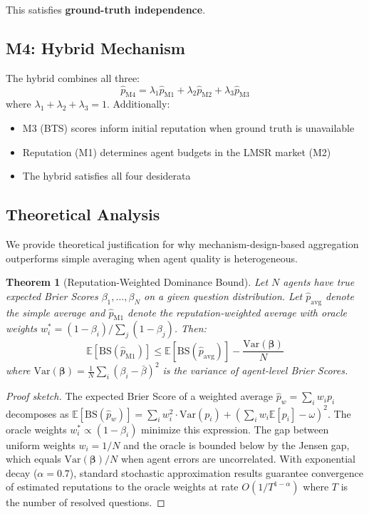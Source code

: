 \documentclass[conference]{IEEEtran}
\newtheorem{theorem}{Theorem}
\begin{document}
This satisfies \textbf{ground-truth independence}.

\subsection{M4: Hybrid Mechanism}

The hybrid combines all three:
\begin{equation}
    \hat{p}_{\text{M4}} = \lambda_1 \hat{p}_{\text{M1}} + \lambda_2 \hat{p}_{\text{M2}} + \lambda_3 \hat{p}_{\text{M3}}
\end{equation}
where $\lambda_1 + \lambda_2 + \lambda_3 = 1$. Additionally:
\begin{itemize}
    \item M3 (BTS) scores inform initial reputation when ground truth is unavailable
    \item Reputation (M1) determines agent budgets in the LMSR market (M2)
    \item The hybrid satisfies all four desiderata
\end{itemize}


\subsection{Theoretical Analysis}
\label{sec:theory}

We provide theoretical justification for why mechanism-design-based aggregation outperforms simple averaging when agent quality is heterogeneous.

\begin{theorem}[Reputation-Weighted Dominance Bound]
\label{thm:reputation}
Let $N$ agents have true expected Brier Scores $\beta_1, \ldots, \beta_N$ on a given question distribution. Let $\hat{p}_{\mathrm{avg}}$ denote the simple average and $\hat{p}_{\mathrm{M1}}$ denote the reputation-weighted average with oracle weights $w_i^* = (1 - \beta_i) / \sum_j (1 - \beta_j)$. Then:
\begin{equation}
    \mathbb{E}[\mathrm{BS}(\hat{p}_{\mathrm{M1}})] \leq \mathbb{E}[\mathrm{BS}(\hat{p}_{\mathrm{avg}})] - \frac{\mathrm{Var}(\boldsymbol{\beta})}{N}
\end{equation}
where $\mathrm{Var}(\boldsymbol{\beta}) = \frac{1}{N}\sum_{i}(\beta_i - \bar{\beta})^2$ is the variance of agent-level Brier Scores.
\end{theorem}

\begin{proof}[Proof sketch]
The expected Brier Score of a weighted average $\hat{p}_w = \sum_i w_i p_i$ decomposes as $\mathbb{E}[\mathrm{BS}(\hat{p}_w)] = \sum_i w_i^2 \cdot \mathrm{Var}(p_i) + (\sum_i w_i \mathbb{E}[p_i] - \omega)^2$. The oracle weights $w_i^* \propto (1-\beta_i)$ minimize this expression. The gap between uniform weights $w_i = 1/N$ and the oracle is bounded below by the Jensen gap, which equals $\mathrm{Var}(\boldsymbol{\beta})/N$ when agent errors are uncorrelated. With exponential decay ($\alpha = 0.7$), standard stochastic approximation results guarantee convergence of estimated reputations to the oracle weights at rate $O(1/T^{1-\alpha})$ where $T$ is the number of resolved questions.
\end{proof}
\end{document}
